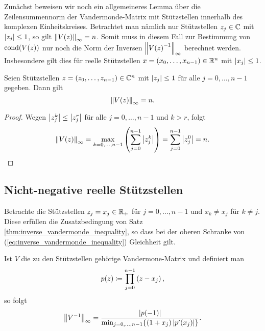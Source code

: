 Zunächst beweisen wir noch ein allgemeineres Lemma über die Zeilensummennorm
der Vandermonde-Matrix mit Stützstellen innerhalb des komplexen
Einheitskreises.
Betrachtet man nämlich nur Stützstellen $z_j \in \mathbb{C}$ mit $\left\lvert z_j \right\rvert \leq 1$,
so gilt $\left\lVert \text{$V(z)$} \right\rVert_{\infty} = n$.
Somit muss in diesem Fall zur Bestimmung von $\text{cond$ \left( \text{$V(z)$} \right)$}$ nur noch die
Norm der Inversen $\left\lVert \text{$V(z)$}^{-1} \right\rVert_{\infty}$ berechnet werden.
Insbesondere gilt dies für reelle Stützstellen
$x = (x_0, \dots, x_{n-1}) \in \mathbb{R}^n$ mit $\left\lvert x_j \right\rvert \leq 1$.

\begin{lemma}
    Seien Stützstellen $z = (z_0, \dots, z_{n-1}) \in \mathbb{C}^n$
    mit $\left\lvert z_j \right\rvert \leq 1$ für alle $j = 0, \dots, n-1$ gegeben.
    Dann gilt
    \[
        \left\lVert V(z) \right\rVert_{\infty} = n.
    \]
\end{lemma}

\begin{proof}
    Wegen $\left\lvert z_j^k \right\rvert \leq \left\lvert z_j^r \right\rvert$ für alle $j = 0, \dots, n-1$ und $k > r$, folgt
    \[
        \left\lVert V(z) \right\rVert_{\infty} = \max_{k=0,\dots,n-1} \left( \sum_{j=0}^{n-1} \left\lvert z_j^k \right\rvert \right) = \sum_{j=0}^{n-1} \left\lvert z_j^0 \right\rvert = n.
    \]
\end{proof}

\subsection{Nicht-negative reelle Stützstellen}
Betrachte die Stützstellen $z_j = x_j \in \mathbb{R}_+$ für $j = 0, \dots, n-1$
und $x_k \neq x_j$ für $k \neq j$.
Diese erfüllen die Zusatzbedingung von Satz \ref{thm:inverse_vandermonde_inequality},
so dass bei der oberen Schranke von (\ref{eq:inverse_vandermonde_inequality})
Gleichheit gilt.
\begin{lemma}
    \label{lemma:nonnegative_real_nodes}
    Ist $V$ die zu den Stützstellen gehörige Vandermone-Matrix und definiert man
    \[
        p(z) \coloneqq \prod_{j=0}^{n-1} \left( z - x_j \right),
    \]
    so folgt
    \[
        \left\lVert V^{-1} \right\rVert_{\infty} = \frac{ \left\lvert p(-1) \right\rvert}{\min_{j=0, \dots, n-1} \{ (1+x_j) \left\lvert p^{\prime}(x_j) \right\rvert \}}.
    \]
\end{lemma}

